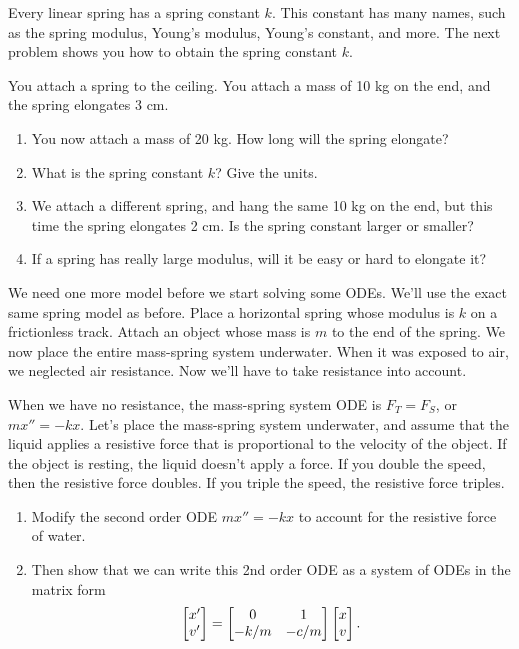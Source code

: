 Every linear spring has a spring constant $k$. This constant has many names, such as the spring modulus, Young's modulus, Young's constant, and more. The next problem shows you how to obtain the spring constant $k$.
\begin{problem}
 You attach a spring to the ceiling. You attach a mass of 10 kg on the end, and the spring elongates 3 cm.  
\begin{enumerate}
 \item You now attach a mass of 20 kg. How long will the spring elongate? 
 \item What is the spring constant $k$? Give the units.
 \item We attach a different spring, and hang the same 10 kg on the end, but this time the spring elongates 2 cm.  Is the spring constant larger or smaller?
 \item If a spring has really large modulus, will it be easy or hard to elongate it?
\end{enumerate}
\end{problem}

We need one more model before we start solving some ODEs.  We'll use the exact same spring model as before. Place a horizontal spring whose modulus is $k$ on a frictionless track. Attach an object whose mass is $m$ to the end of the spring.  
We now place the entire mass-spring system underwater. When it was exposed to air, we neglected air resistance. Now we'll have to take resistance into account.   
\begin{problem}\label{mass-spring set up problem}
 When we have no resistance, the mass-spring system ODE is $F_T=F_S$, or $mx'' = -kx$.  Let's place the mass-spring system underwater, and assume that the liquid applies a resistive force that is proportional to the velocity of the object.  If the object is resting, the liquid doesn't apply a force.  If you double the speed, then the resistive force doubles.  If you triple the speed, the resistive force triples. 
\begin{enumerate}
 \item Modify the second order ODE $mx''=-kx$ to account for the resistive force of water. 
 \item Then show that we can write this 2nd order ODE as a system of ODEs in the matrix form
$$\begin{bmatrix} x'\\v' \end{bmatrix} = \begin{bmatrix} 0&1\\-k/m&-c/m \end{bmatrix}\begin{bmatrix} x\\v \end{bmatrix}.$$

\end{enumerate}

\end{problem}












